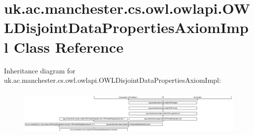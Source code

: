 \hypertarget{classuk_1_1ac_1_1manchester_1_1cs_1_1owl_1_1owlapi_1_1_o_w_l_disjoint_data_properties_axiom_impl}{\section{uk.\-ac.\-manchester.\-cs.\-owl.\-owlapi.\-O\-W\-L\-Disjoint\-Data\-Properties\-Axiom\-Impl Class Reference}
\label{classuk_1_1ac_1_1manchester_1_1cs_1_1owl_1_1owlapi_1_1_o_w_l_disjoint_data_properties_axiom_impl}
}
Inheritance diagram for uk.\-ac.\-manchester.\-cs.\-owl.\-owlapi.\-O\-W\-L\-Disjoint\-Data\-Properties\-Axiom\-Impl\-:\begin{figure}[H]
\begin{center}
\leavevmode
\includegraphics[height=2.308599cm]{classuk_1_1ac_1_1manchester_1_1cs_1_1owl_1_1owlapi_1_1_o_w_l_disjoint_data_properties_axiom_impl}
\end{center}
\end{figure}
